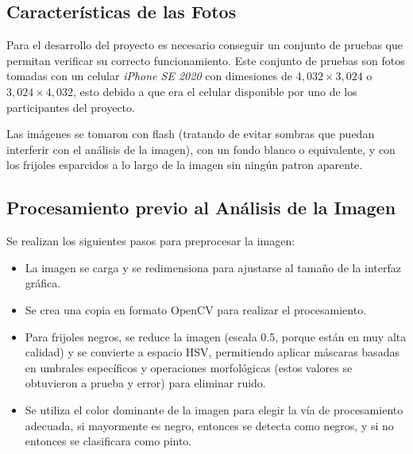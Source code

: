 \documentclass[conference]{IEEEtran}
\begin{document}
    \subsection{Características de las Fotos}
    Para el desarrollo del proyecto es necesario conseguir un conjunto de pruebas que permitan verificar su correcto funcionamiento. Este conjunto de pruebas son fotos tomadas con un celular \textit{iPhone SE 2020}\cite{iphone} con dimesiones de $4,032 \times 3,024$ o $3,024 \times 4,032$, esto debido a que era el celular disponible por uno de los participantes del proyecto.

    Las imágenes se tomaron con flash (tratando de evitar sombras que puedan interferir con el análisis de la imagen), con un fondo blanco o equivalente, y con los frijoles esparcidos a lo largo de la imagen sin ningún patron aparente.

    \subsection{Procesamiento previo al Análisis de la Imagen}
    Se realizan los siguientes pasos para preprocesar la imagen:
    \begin{itemize}
        \item La imagen se carga y se redimensiona para ajustarse al tamaño de la interfaz gráfica.
        \item Se crea una copia en formato OpenCV para realizar el procesamiento.
        \item Para frijoles negros, se reduce la imagen (escala 0.5, porque están en muy alta calidad) y se convierte a espacio HSV, permitiendo aplicar máscaras basadas en umbrales específicos y operaciones morfológicas (estos valores se obtuvieron a prueba y error) para eliminar ruido.
        \item Se utiliza el color dominante de la imagen para elegir la vía de procesamiento adecuada, si mayormente es negro, entonces se detecta como negros, y si no entonces se clasificara como pinto.
    \end{itemize}
    
\end{document}

